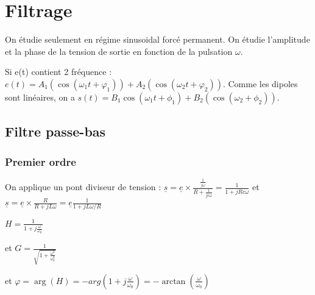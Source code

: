\documentclass[french]{yLectureNote}
\begin{document}
\chapter{Filtrage}

On étudie seulement en régime sinusoidal forcé permanent. On étudie l'amplitude et la phase de la tension de sortie en fonction de la pulsation \(\omega\).

Si e(t) contient 2 fréquence : \(e(t) = A_1(\cos(\omega_1t+\varphi_1))+A_2(\cos(\omega_2t+\varphi_2))\). Comme les dipoles sont linéaires, on a \(s(t) = B_1\cos(\omega_1t + \phi_1) + B_2(\cos(\omega_2+\phi_2))\).

\section{Filtre passe-bas}
\subsection{Premier ordre}
On applique un pont diviseur de tension : \(\underline{s} = \underline{e} \times \frac{\frac{1}{j\omega}}{R+\frac{1}{jc\omega}} = \frac{1}{1+jRc\omega}\) et \(\underline{s} = \underline{e} \times \frac{R}{R+jL\omega} = \underline{e} \frac{1}{1+jL\omega/R}\)

\(H = \frac{1}{1+j\frac{\omega}{\omega_0}}\)

et \(G = \frac{1}{\sqrt{1+\frac{\omega^2}{\omega_0^2}}}\)

et \(\varphi = \arg(H) = -arg(1+j\frac{\omega}{\omega_0}) = -\arctan(\frac{\omega}{\omega_0})\)
\end{document}
